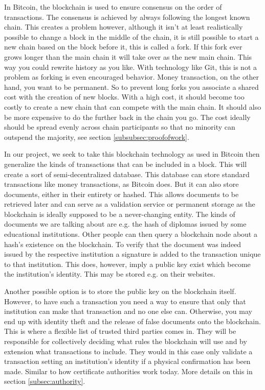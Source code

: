 \documentclass[12pt]{article}
\begin{document}

In Bitcoin, the blockchain is used to ensure consensus on the order of transactions. The consensus is achieved by always following the longest known chain. This creates a problem however, although it isn't at least realistically possible to change a block in the middle of the chain, it is still possible to start a new chain based on the block before it, this is called a fork. If this fork ever grows longer than the main chain it will take over as the new main chain. This way you could rewrite history as you like. With technology like Git, this is not a problem as forking is even encouraged behavior. Money transaction, on the other hand, you want to be permanent. So to prevent long forks you associate a shared cost with the creation of new blocks. With a high cost, it should become too costly to create a new chain that can compete with the main chain. It should also be more expensive to do the further back in the chain you go. The cost ideally should be spread evenly across chain participants so that no minority can outspend the majority, see section \ref{subsubsec:proofofwork}.
 
In our project, we seek to take this blockchain technology as used in Bitcoin then generalize the kinds of transactions that can be included in a block. This will create a sort of semi-decentralized database. This database can store standard transactions like money transactions, as Bitcoin does. But it can also store documents, either in their entirety or hashed. This allows documents to be retrieved later and can serve as a validation service or permanent storage as the blockchain is ideally supposed to be a never-changing entity. The kinds of documents we are talking about are e.g. the hash of diplomas issued by some educational institutions. Other people can then query a blockchain node about a hash's existence on the blockchain. To verify that the document was indeed issued by the respective institution a signature is added to the transaction unique to that institution. This does, however, imply a public key exist which become the institution's identity. This may be stored e.g. on their websites.

Another possible option is to store the public key on the blockchain itself. However, to have such a transaction you need a way to ensure that only that institution can make that transaction and no one else can. Otherwise, you may end up with identity theft and the release of false documents onto the blockchain. This is where a flexible list of trusted third parties comes in. They will be responsible for collectively deciding what rules the blockchain will use and by extension what transactions to include. They would in this case only validate a transaction setting an institution's identity if a physical confirmation has been made. Similar to how certificate authorities work today. More details on this in section \ref{subsec:authority}.
\end{document}
